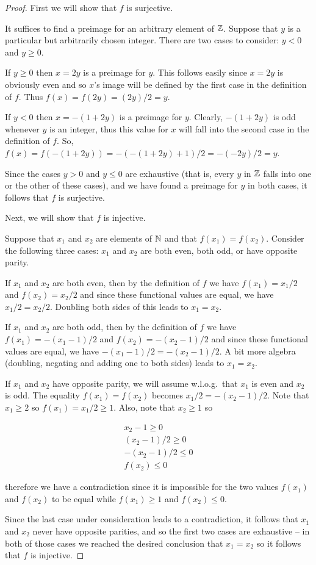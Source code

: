 \begin{proof}
First we will show that $f$ is surjective.
 
It suffices to find a preimage for an arbitrary element of ${\mathbb Z}$.
Suppose that $y$ is a particular but arbitrarily chosen integer.  There 
are two cases to consider: $y<0$ and $y\geq0$.

If $y\geq0$ then $x=2y$ is a preimage for $y$.  This follows easily since
$x=2y$ is obviously even and so $x$'s image will be
defined by the first case in the definition of $f$.  Thus $f(x) = f(2y) =
(2y)/2 = y$.

If $y < 0$ then $x=-(1+2y)$ is a preimage for $y$.  Clearly, $-(1+2y)$ is odd
whenever $y$ is an integer, thus this value for $x$ will fall into the second 
case in the definition of $f$.  So, $f(x) = f(-(1+2y)) = -(-(1+2y)+1)/2 = -(-2y)/2 = y$.

Since the cases $y>0$ and $y\leq 0$ are exhaustive (that is, every $y$ in 
${\mathbb Z}$ falls into one or the other of these cases), and we have found
a preimage for $y$ in both cases, it follows that $f$ is surjective.

Next, we will show that $f$ is injective.

Suppose that $x_1$ and $x_2$ are elements of ${\mathbb N}$ and that
$f(x_1)=f(x_2)$.  Consider the following three cases: $x_1$ and $x_2$
are both even, both odd, or have opposite parity.

If $x_1$ and $x_2$ are both even, then by the definition of $f$ we
have $f(x_1) = x_1/2$ and $f(x_2) = x_2/2$ and since these functional
values are equal, we have $x_1/2 = x_2/2$.  Doubling both sides of this
leads to $x_1=x_2$.

If $x_1$ and $x_2$ are both odd, then by the definition of $f$ we
have $f(x_1) = -(x_1-1)/2$ and $f(x_2) = -(x_2-1)/2$ and since these functional
values are equal, we have $-(x_1-1)/2 = -(x_2-1)/2$.  A bit more
algebra (doubling, negating and adding one to both sides) leads to 
$x_1=x_2$. 

If $x_1$ and $x_2$ have opposite parity, we will assume w.l.o.g.\ that 
$x_1$ is even and $x_2$ is odd.  The equality $f(x_1)=f(x_2)$ becomes
$x_1/2 = -(x_2-1)/2$.  Note that $x_1 \geq 2$ so $f(x_1) = x_1/2 \geq 1$.
Also, note that $x_2 \geq 1$ so 

\begin{gather*}
x_2 - 1 \geq 0 \\
(x_2-1)/2 \geq 0 \\
-(x_2-1)/2 \leq 0 \\
f(x_2) \leq 0
\end{gather*}

\noindent therefore we have a contradiction since it is impossible
for the two values $f(x_1)$ and $f(x_2)$ to be equal while $f(x_1) \geq 1$
and $f(x_2) \leq 0$.

Since the last case under consideration leads to a contradiction, it follows
that $x_1$ and $x_2$ never have opposite parities, and so the first two
cases are exhaustive -- in both of those cases we reached the desired
conclusion that $x_1 = x_2$ so it follows that $f$ is injective.
\end{proof}

